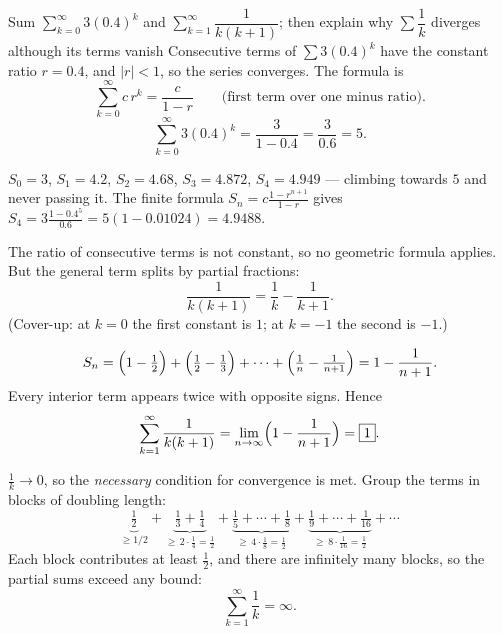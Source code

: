 \begin{worked}{Sum $\sum_{k=0}^{\infty}3(0.4)^{k}$ and $\sum_{k=1}^{\infty}\dfrac{1}{k(k+1)}$; then explain why $\sum\dfrac1k$ diverges although its terms vanish}
Consecutive terms of $\sum 3(0.4)^{k}$ have the constant ratio
$r=0.4$, and $|r|<1$, so the series converges. The formula is
\[
  \sum_{k=0}^{\infty}c\,r^{k}=\frac{c}{1-r}
  \qquad\text{(first term over one minus ratio).}
\]
\[
  \sum_{k=0}^{\infty}3(0.4)^{k}=\frac{3}{1-0.4}=\frac{3}{0.6}=\boxed{5}.
\]

$S_{0}=3$, $S_{1}=4.2$, $S_{2}=4.68$, $S_{3}=4.872$, $S_{4}=4.949$ --- 
climbing towards $5$ and never passing it. The finite formula
$S_{n}=c\frac{1-r^{n+1}}{1-r}$ gives $S_{4}=3\frac{1-0.4^{5}}{0.6}
=5(1-0.01024)=4.9488$. \checkmark

The ratio of consecutive terms is not constant, so no geometric formula
applies. But the general term splits by partial fractions:
\[
  \frac{1}{k(k+1)}=\frac{1}{k}-\frac{1}{k+1} .
\]
(Cover-up: at $k=0$ the first constant is $1$; at $k=-1$ the second is
$-1$.)

\[
  S_{n}=\Bigl(1-\tfrac12\Bigr)+\Bigl(\tfrac12-\tfrac13\Bigr)
       +\cdots+\Bigl(\tfrac1n-\tfrac{1}{n+1}\Bigr)
       =1-\frac{1}{n+1} .
\]
Every interior term appears twice with opposite signs. Hence
\[
  \sum_{k=1}^{\infty}\frac{1}{k(k+1)}=\lim_{n\to\infty}\Bigl(1-\frac{1}{n+1}\Bigr)=\boxed{1}.
\]

$\frac1k\to0$, so the \emph{necessary} condition for convergence is met.
Group the terms in blocks of doubling length:
\[
  \underbrace{\tfrac12}_{\ge1/2}
  +\underbrace{\tfrac13+\tfrac14}_{\ge\,2\cdot\frac14=\frac12}
  +\underbrace{\tfrac15+\cdots+\tfrac18}_{\ge\,4\cdot\frac18=\frac12}
  +\underbrace{\tfrac19+\cdots+\tfrac{1}{16}}_{\ge\,8\cdot\frac{1}{16}=\frac12}+\cdots
\]
Each block contributes at least $\tfrac12$, and there are infinitely many
blocks, so the partial sums exceed any bound:
\[
  \sum_{k=1}^{\infty}\frac1k=\infty .
\]


\end{worked}
